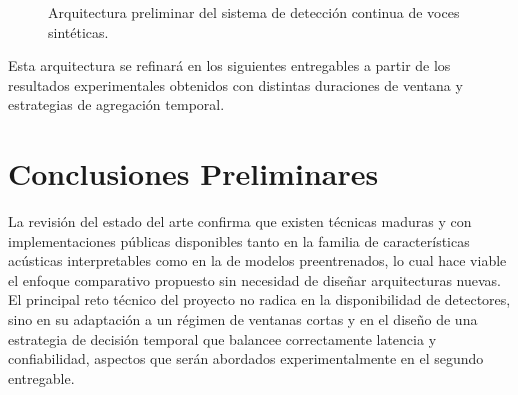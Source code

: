 \documentclass[conference]{IEEEtran}
\begin{document}
\begin{figure}[htbp]
\centering
{}
\caption{Arquitectura preliminar del sistema de detección continua de voces sintéticas.}
\label{fig:arquitectura}
\end{figure}

Esta arquitectura se refinará en los siguientes entregables a partir de los resultados experimentales obtenidos con distintas duraciones de ventana y estrategias de agregación temporal.

\section{Conclusiones Preliminares}

La revisión del estado del arte confirma que existen técnicas maduras y con implementaciones públicas disponibles tanto en la familia de características acústicas interpretables como en la de modelos preentrenados, lo cual hace viable el enfoque comparativo propuesto sin necesidad de diseñar arquitecturas nuevas. El principal reto técnico del proyecto no radica en la disponibilidad de detectores, sino en su adaptación a un régimen de ventanas cortas y en el diseño de una estrategia de decisión temporal que balancee correctamente latencia y confiabilidad, aspectos que serán abordados experimentalmente en el segundo entregable.
\end{document}

